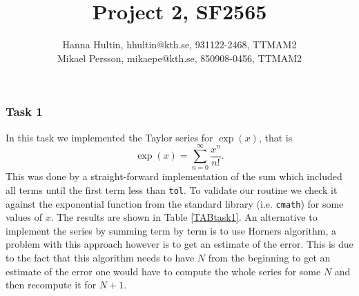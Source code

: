 \documentclass[a4paper,10pt]{article}
\title{Project 2, SF2565}
\author{Hanna Hultin, hhultin@kth.se, 931122-2468, TTMAM2 \\ Mikael Persson, mikaepe@kth.se, 850908-0456, TTMAM2}
\begin{document}
\maketitle

\subsubsection*{Task 1}
In this task we implemented the Taylor series for $\exp (x)$, that is 
\begin{equation*}
  \exp(x) = \sum_{n=0}^\infty \frac{x^{n}}{n!}.
\end{equation*}
This was done by a straight-forward implementation of the 
sum which included all terms until the first term less than \texttt{tol}.
To validate our routine we check it against the exponential function from the 
standard library (i.e. \texttt{cmath}) for some values of $x$. 
The results are shown in Table \ref{TABtask1}.
An alternative to implement the series by summing term by term is to use Horners algorithm, 
a problem with this approach however is to get an estimate of the error. This is due
to the fact that this algorithm 
needs to have $N$ from the beginning to get an estimate of the error one would have to compute the
whole series for some $N$ and then recompute it for $N+1$.
\end{document}
